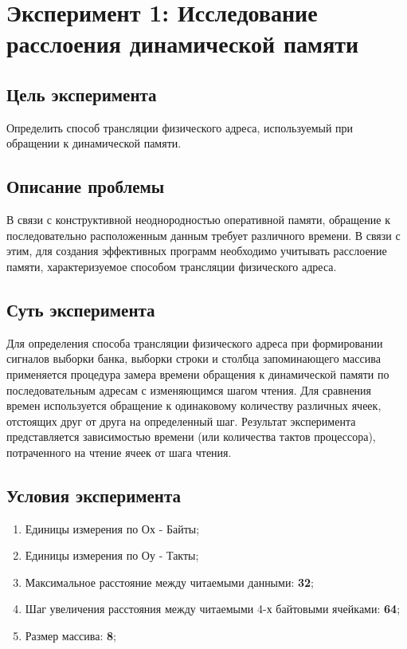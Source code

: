 \chapter{Эксперимент 1: Исследование расслоения динамической памяти}

\section{Цель эксперимента}
Определить способ трансляции физического адреса, используемый при обращении к динамической памяти.  

\section{Описание проблемы}
В связи с конструктивной неоднородностью оперативной памяти, обращение к последовательно расположенным данным требует различного времени. В связи с этим, для создания эффективных программ необходимо учитывать расслоение памяти, характеризуемое способом трансляции физического адреса. 

\section{Суть эксперимента}
Для определения способа трансляции физического адреса при формировании сигналов выборки банка, выборки строки и столбца запоминающего массива применяется процедура замера времени обращения к динамической памяти по последовательным адресам с изменяющимся шагом чтения. Для сравнения времен используется обращение к одинаковому количеству различных ячеек,  отстоящих друг от друга  на  определенный шаг. Результат эксперимента представляется зависимостью  времени (или количества тактов процессора), потраченного на чтение ячеек от шага чтения. 

\section{Условия эксперимента}
\begin{enumerate}
    \item Единицы измерения по Ох - Байты;
    \item Единицы измерения по Оу - Такты;
    \item Максимальное расстояние между читаемыми данными: \textbf{32};
    \item Шаг увеличения расстояния между читаемыми 4-х байтовыми ячейками: \textbf{64};
    \item Размер массива: \textbf{8};
\end{enumerate}

